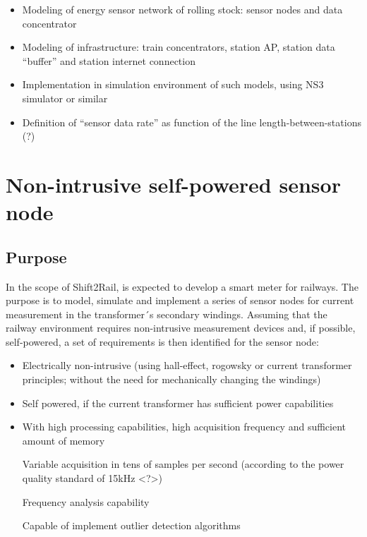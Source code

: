 \begin{itemize}
	\setlength\itemsep{0em}

	\item Modeling of energy sensor network of rolling stock: sensor nodes and data concentrator

	\item Modeling of infrastructure: train concentrators, station AP, station data “buffer” and station internet connection

	\item Implementation in simulation environment of such models, using NS3 simulator or similar

	\item Definition of “sensor data rate” as function of the line length-between-stations (?)
	
\end{itemize}





\newpage
\section{Non-intrusive self-powered sensor node}

\subsection{Purpose}
In the scope of Shift2Rail, is expected to develop a smart meter for railways. The purpose is to model, simulate and implement a series of sensor nodes for current measurement in the transformer´s secondary windings. Assuming that the railway environment requires non-intrusive measurement devices and, if possible, self-powered, a set of requirements is then identified for the sensor node:

\begin{itemize}
	\setlength\itemsep{0em}
	\item Electrically non-intrusive (using hall-effect, rogowsky or current transformer principles; without the need for mechanically changing the windings)

	\item Self powered, if the current transformer has sufficient power capabilities

	\item With high processing capabilities, high acquisition frequency and sufficient amount of memory 

	\subitem Variable acquisition in tens of samples per second (according to the power quality standard of 15kHz <?>)

	\subitem Frequency analysis capability

	\subitem Capable of implement outlier detection algorithms 
\end{itemize}

